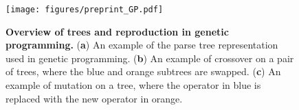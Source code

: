 \begin{figure}[t]  %
    \centering
    \texttt{[image: figures/preprint\_GP.pdf]} %
    \caption{\textbf{Overview of trees and reproduction in genetic programming.} (\textbf{a}) An example of the parse tree representation used in genetic programming. (\textbf{b}) An example of crossover on a pair of trees, where the blue and orange subtrees are swapped. (\textbf{c}) An example of mutation on a tree, where the operator in blue is replaced with the new operator in orange.}
    \label{fig: overview}
\end{figure}